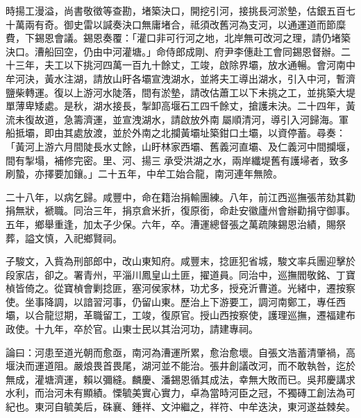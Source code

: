 \begin{pinyinscope}
時揚工漫溢，尚書敬徵等查勘，堵築決口，開挖引河，接挑長河淤墊，估銀五百七十萬兩有奇。御史雷以諴奏決口無庸堵合，祗須改舊河為支河，以通運道而節糜費，下錫恩會議。錫恩奏覆：「灌口非可行河之地，北岸無可改河之理，請仍堵築決口。漕船回空，仍由中河灌塘。」命侍郎成剛、府尹李僡赴工會同錫恩督辦。二十三年，夫工以下挑河四萬一百九十餘丈，工竣，啟除界壩，放水通暢。會河南中牟河決，黃水注湖，請放山盱各壩宣洩湖水，並將夫工導出湖水，引入中河，暫濟鹽柴轉運。復以上游河水陡落，間有淤墊，請改估蕭工以下未挑之工，並挑築大堤單薄卑矮處。是秋，湖水接長，掣卸高堰石工四千餘丈，搶護未決。二十四年，黃流未復故道，急籌濟運，並宣洩湖水，請啟放外南屬順清河，導引入河歸海。軍船抵壩，即由其處放渡，並於外南之北攔黃壩址築鉗口土壩，以資停蓄。尋奏：「黃河上游六月間陡長水丈餘，山盱林家西壩、舊義河直壩、及仁義河中間攔堰，間有掣塌，補修完密。里、河、揚三承受洪湖之水，兩岸纖堤舊有護埽者，致多刷蟄，亦擇要加鑲。」二十五年，中牟工始合龍，南河連年無險。

二十八年，以病乞歸。咸豐中，命在籍治捐輸團練。八年，前江西巡撫張芾劾其勸捐無狀，褫職。同治三年，捐京倉米折，復原銜，命赴安徽廬州會辦勸捐守御事。五年，鄉舉重逢，加太子少保。六年，卒。漕運總督張之萬疏陳錫恩治績，賜祭葬，謚文慎，入祀鄉賢祠。

子駿文，入貲為刑部郎中，改山東知府。咸豐末，捻匪犯省城，駿文率兵團迎擊於段家店，卻之。署青州，平淄川鳳皇山土匪，擢道員。同治中，巡撫閻敬銘、丁寶楨皆倚之。從寶楨會剿捻匪，塞河侯家林，功尤多，授兗沂曹道。光緒中，遷按察使。坐事降調，以諳習河事，仍留山東。歷治上下游要工，調河南鄭工，專任西壩，以合龍愆期，革職留工，工竣，復原官。授山西按察使，護理巡撫，遷福建布政使。十九年，卒於官。山東士民以其治河功，請建專祠。

論曰：河患至道光朝而愈亟，南河為漕運所累，愈治愈壞。自張文浩蓄清肇禍，高堰決而運道阻。嚴烺畏首畏尾，湖河並不能治。張井創議改河，而不敢執咎，迄於無成，灌塘濟運，賴以彌縫。麟慶、潘錫恩循其成法，幸無大敗而已。吳邦慶講求水利，而治河未有顯績。慄毓美實心實力，卓為當時河臣之冠，不獨磚工創法為可紀也。東河自毓美后，硃襄、鍾祥、文沖繼之，祥符、中牟迭決，東河遂益棘矣。


\end{pinyinscope}